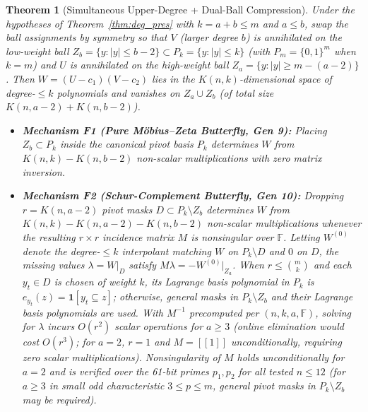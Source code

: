 \documentclass[11pt,a4paper]{article}
\newtheorem{theorem}{Theorem}[section]
\newcommand{\wt}[1]{|#1|}
\begin{document}
\begin{theorem}[Simultaneous Upper-Degree + Dual-Ball Compression]
\label{thm:mech_f}
Under the hypotheses of Theorem~\ref{thm:deg_pres} with $k = a + b \le m$ and $a \le b$, swap the ball assignments by symmetry so that $V$ (larger degree $b$) is annihilated on the low-weight ball $Z_b = \{y : \wt{y} \le b - 2\} \subset P_k = \{y : \wt{y} \le k\}$ (with $P_m = \{0,1\}^m$ when $k = m$) and $U$ is annihilated on the high-weight ball $Z_a = \{y : \wt{y} \ge m - (a - 2)\}$. Then $W = (U - c_1)(V - c_2)$ lies in the $K(n, k)$-dimensional space of degree-$\le k$ polynomials and vanishes on $Z_a \cup Z_b$ (of total size $K(n, a-2) + K(n, b-2)$).
\begin{itemize}
  \item \textbf{Mechanism F1 (Pure M\"obius--Zeta Butterfly, Gen 9):} Placing $Z_b \subset P_k$ inside the canonical pivot basis $P_k$ determines $W$ from $K(n, k) - K(n, b - 2)$ non-scalar multiplications with zero matrix inversion.
  \item \textbf{Mechanism F2 (Schur-Complement Butterfly, Gen 10):} Dropping $r = K(n, a-2)$ pivot masks $D \subset P_k \setminus Z_b$ determines $W$ from $K(n, k) - K(n, a-2) - K(n, b-2)$ non-scalar multiplications whenever the resulting $r \times r$ incidence matrix $M$ is nonsingular over $\mathbb{F}$. Letting $W^{(0)}$ denote the degree-$\le k$ interpolant matching $W$ on $P_k \setminus D$ and $0$ on $D$, the missing values $\lambda = W|_D$ satisfy $M \lambda = -W^{(0)}|_{Z_a}$. When $r \le \binom{m}{k}$ and each $y_t \in D$ is chosen of weight $k$, its Lagrange basis polynomial in $P_k$ is $e_{y_t}(z) = \mathbf{1}[y_t \subseteq z]$; otherwise, general masks in $P_k \setminus Z_b$ and their Lagrange basis polynomials are used. With $M^{-1}$ precomputed per $(n, k, a, \mathbb{F})$, solving for $\lambda$ incurs $O(r^2)$ scalar operations for $a \ge 3$ (online elimination would cost $O(r^3)$; for $a = 2$, $r = 1$ and $M = [[1]]$ unconditionally, requiring zero scalar multiplications). Nonsingularity of $M$ holds unconditionally for $a = 2$ and is verified over the 61-bit primes $p_1, p_2$ for all tested $n \le 12$ (for $a \ge 3$ in small odd characteristic $3 \le p \le m$, general pivot masks in $P_k \setminus Z_b$ may be required).
\end{itemize}
\end{theorem}
\end{document}
